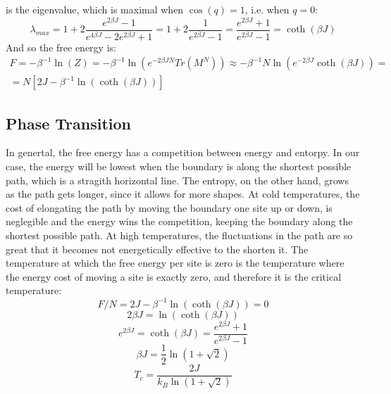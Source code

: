 \documentclass{article}
\begin{document}
is the eigenvalue, which is maximal when $\cos(q) = 1$, i.e. when $q = 0$:
\begin{equation}
    \lambda_{max} = 1 + 2\frac{e^{2\beta J}-1}{e^{4\beta J} - 2e^{2\beta J}+1} = 1 + 2\frac{1}{e^{2\beta J}-1} = \frac{e^{2\beta J} + 1}{e^{2\beta J} - 1} = \coth(\beta J)
\end{equation}
And so the free energy is:
\begin{equation}
\begin{gathered}
    F = -\beta^{-1}\ln(Z) =
    -\beta^{-1}\ln(e^{-2\beta JN} Tr(M^N)) \approx -\beta^{-1}N
        \ln(e^{-2\beta J}\coth(\beta J)) = \\ =
    N\left[2J - \beta^{-1}\ln(\coth(\beta J))\right]
\end{gathered}
\end{equation}
\subsection{Phase Transition}
In genertal, the free energy has a competition between energy and entorpy. In our case, the energy will be lowest when the boundary is along the shortest possible path, which is a stragith horizontal line. The entropy, on the other hand, grows as the path gets longer, since it allows for more shapes. At cold temperatures, the cost of elongating the path by moving the boundary one site up or down, is neglegible and the energy wins the competition, keeping the boundary along the shortest possible path. At high temperatures, the fluctuations in the path are so great that it becomes not energetically effective to the shorten it.
\newline
The temperature at which the free energy per site is zero is the temperature where the energy cost of moving a site is exactly zero, and therefore it is the critical temperature:
\begin{equation}
    F/N = 2J - \beta^{-1}\ln(\coth(\beta J)) = 0
\end{equation}
\begin{equation}
    2\beta J = \ln(\coth(\beta J))
\end{equation}
\begin{equation}
    e^{2\beta J} = \coth(\beta J) = \frac{e^{2\beta J} + 1}{e^{2\beta J} - 1}
\end{equation}
\begin{equation}
    \beta J = \frac{1}{2}\ln(1 + \sqrt{2})
\end{equation}
\begin{equation}
    T_c = \frac{2J}{k_B \ln(1 + \sqrt{2})}
\end{equation}
\end{document}
